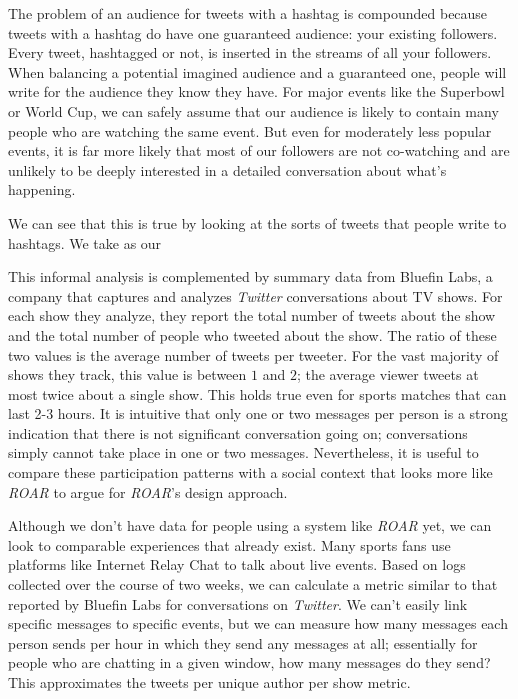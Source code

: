 The problem of an audience for tweets with a hashtag is compounded because tweets with a hashtag do have one guaranteed audience: your existing followers. Every tweet, hashtagged or not, is inserted in the streams of all your followers. When balancing a potential imagined audience and a guaranteed one, people will write for the audience they know they have. For major events like the Superbowl or World Cup, we can safely assume that our audience is likely to contain many people who are watching the same event. But even for moderately less popular events, it is far more likely that most of our followers are not co-watching and are unlikely to be deeply interested in a detailed conversation about what's happening. 

We can see that this is true by looking at the sorts of tweets that people write to hashtags. We take as our 


This informal analysis is complemented by summary data from Bluefin Labs, a company that captures and analyzes \emph{Twitter} conversations about TV shows. For each show they analyze, they report the total number of tweets about the show and the total number of people who tweeted about the show. The ratio of these two values is the average number of tweets per tweeter. For the vast majority of shows they track, this value is between $1$ and $2$; the average viewer tweets at most twice about a single show. This holds true even for sports matches that can last 2-3 hours. It is intuitive that only one or two messages per person is a strong indication that there is not significant conversation going on; conversations simply cannot take place in one or two messages. Nevertheless, it is useful to compare these participation patterns with a social context that looks more like \emph{ROAR} to argue for \emph{ROAR}'s design approach.


Although we don't have data for people using a system like \emph{ROAR} yet, we can look to comparable experiences that already exist. Many sports fans use platforms like Internet Relay Chat to talk about live events. Based on logs collected over the course of two weeks, we can calculate a metric similar to that reported by Bluefin Labs for conversations on \emph{Twitter}. We can't easily link specific messages to specific events, but we can measure how many messages each person sends per hour in which they send any messages at all; essentially for people who are chatting in a given window, how many messages do they send? This approximates the tweets per unique author per show metric. 

